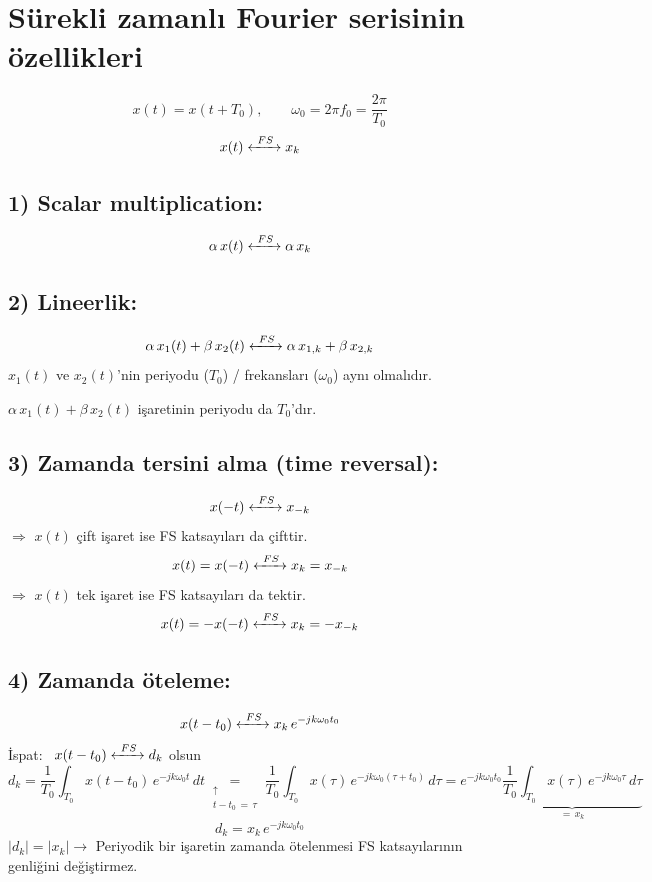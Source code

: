 \documentclass[11pt,a4paper]{article}
\begin{document}
\renewcommand{\thempfootnote}{\alph{mpfootnote}} %

\section{Sürekli zamanlı Fourier serisinin özellikleri}
\[ x(t) = x(t + T_0), \qquad \omega_0 = 2\pi f_0 = \frac{2\pi}{T_0} \]
\[ x(t) \xleftrightarrow{\ FS\ } x_k \]

\subsection{1) Scalar multiplication:}
\[ \alpha\,x(t) \xleftrightarrow{\ FS\ } \alpha\,x_k \]

\subsection{2) Lineerlik:}
\[ \alpha\,x_1(t) + \beta\,x_2(t) \xleftrightarrow{\ FS\ } \alpha\,x_{1,k} + \beta\,x_{2,k} \]
$x_1(t)$ ve $x_2(t)$'nin periyodu ($T_0$) / frekansları ($\omega_0$) aynı olmalıdır.

$\alpha\,x_1(t) + \beta\,x_2(t)$ işaretinin periyodu da $T_0$'dır.

\subsection{3) Zamanda tersini alma (time reversal):}
\[ x(-t) \xleftrightarrow{\ FS\ } x_{-k} \]
$\Rightarrow$ $x(t)$ çift işaret ise FS katsayıları da çifttir.
\[ x(t) = x(-t) \xleftrightarrow{\ FS\ } x_k = x_{-k} \]
$\Rightarrow$ $x(t)$ tek işaret ise FS katsayıları da tektir.
\[ x(t) = -x(-t) \xleftrightarrow{\ FS\ } x_k = -x_{-k} \]

\subsection{4) Zamanda öteleme:}
\[ x(t - t_0) \xleftrightarrow{\ FS\ } x_k\,e^{-jk\omega_0 t_0} \]
İspat: \ $x(t - t_0) \xleftrightarrow{\ FS\ } d_k$ olsun
\[ d_k = \frac{1}{T_0}\int_{T_0} x(t - t_0)\,e^{-jk\omega_0 t}\,dt \underset{\substack{\uparrow\\ t - t_0\,=\,\tau}}{=} \frac{1}{T_0}\int_{T_0} x(\tau)\,e^{-jk\omega_0(\tau + t_0)}\,d\tau = e^{-jk\omega_0 t_0}\underbrace{\frac{1}{T_0}\int_{T_0} x(\tau)\,e^{-jk\omega_0\tau}\,d\tau}_{=\,x_k} \]
\[ d_k = x_k\,e^{-jk\omega_0 t_0} \]
$|d_k| = |x_k| \longrightarrow$ Periyodik bir işaretin zamanda ötelenmesi FS katsayılarının genliğini değiştirmez.
\end{document}
